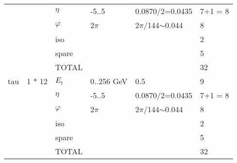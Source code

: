 \documentclass{cmspaper}
\begin{document}
\begin{table}[ht]
\begin{tabular}{| l | l | l | l | l | l |}
	&		&	$\eta$	&	-5..5	&	0.0870/2=0.0435	&	7+1 = 8                    \\
	&		&	$\varphi$	&	2$\pi$	&	2$\pi$/144$\sim$0.044	&	8                    \\
	&		&	iso	&		&		&	2                    \\
	&		&	spare	&		&		&	5                    \\
	&		&	TOTAL	&		&		&	32                    \\
\hline
tau	&	1 * 12	&	$E_t$	&	0..256 GeV	&	0.5	&	9                    \\
	&		&	$\eta$	&	-5..5	&	0.0870/2=0.0435	&	7+1 = 8                    \\
	&		&	$\varphi$	&	2$\pi$	&	2$\pi$/144$\sim$0.044	&	8                    \\
	&		&	iso	&		&		&	2                    \\
	&		&	spare	&		&		&	5                    \\
	&		&	TOTAL	&		&		&	32                    \\
\hline
\end{tabular}
\label{table:scales_table_1}
\end{table}
\end{document}
